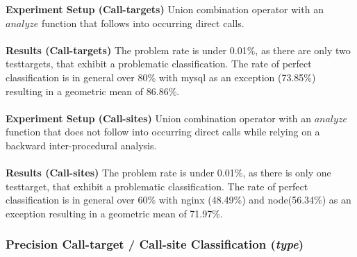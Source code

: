 \textbf{Experiment Setup (Call-targets)}
{Union combination operator with an $analyze$ function that follows into occurring direct calls.
}\\~\\
\textbf{Results (Call-targets)}{
The problem rate is under 0.01\%, as there are only two testtargets, that exhibit a problematic classification. The rate of perfect classification is in general over 80\% with mysql as an exception (73.85\%) resulting in a geometric mean of 86.86\%.
}\\~\\
\textbf{Experiment Setup (Call-sites)}
{ Union combination operator with an $analyze$ function that does not follow into occurring direct calls while relying on a backward inter-procedural analysis.
}\\~\\
\textbf{Results (Call-sites)} {
The problem rate is under 0.01\%, as there is only one testtarget, that exhibit a problematic classification. The rate of perfect classification is in general over 60\% with nginx (48.49\%) and node(56.34\%) as an exception resulting in a geometric mean of 71.97\%.}


\subsubsection{Precision Call-target / Call-site Classification (\textit{type})}
\label{subsection:typeshieldcountprecision}

